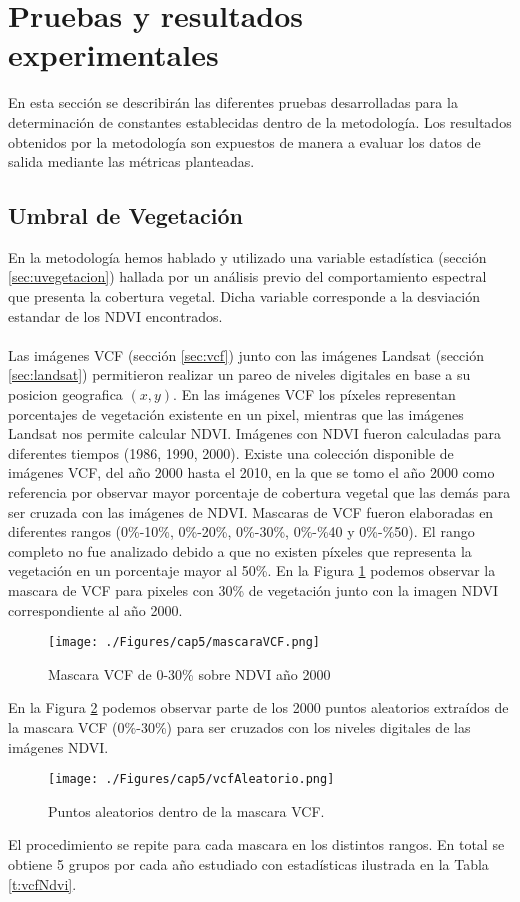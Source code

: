 \section{Pruebas y resultados experimentales}
En esta secci\'on se describir\'an las diferentes pruebas desarrolladas para la determinaci\'on de constantes establecidas dentro de la metodolog\'ia. Los resultados obtenidos por la metodolog\'ia son expuestos de manera a evaluar los datos de salida mediante las m\'etricas planteadas.
\subsection{Umbral de Vegetaci\'on}\label{subsec:umbralVegetacion}
En la metodolog\'ia hemos hablado y utilizado una variable estad\'istica (secci\'on \ref{sec:uvegetacion}) hallada por un an\'alisis previo del comportamiento espectral que presenta la cobertura vegetal. Dicha variable corresponde a la desviaci\'on estandar de los NDVI encontrados.\\~\\
Las im\'agenes VCF (secci\'on \ref{sec:vcf}) junto con las im\'agenes Landsat (secci\'on \ref{sec:landsat}) permitieron realizar un pareo de niveles digitales en base a su posicion geografica $ (x,y) $. En las im\'agenes VCF los p\'ixeles representan porcentajes de vegetaci\'on existente en un pixel, mientras que las im\'agenes Landsat nos permite calcular NDVI. Im\'agenes con NDVI fueron calculadas para diferentes tiempos (1986, 1990, 2000). Existe una colecci\'on disponible de im\'agenes VCF, del a\~{n}o 2000 hasta el 2010, en la que se tomo el a\~{n}o 2000 como referencia por observar mayor porcentaje de cobertura vegetal que las dem\'as para ser cruzada con las im\'agenes de NDVI. Mascaras de VCF fueron elaboradas en diferentes rangos (0\%-10\%, 0\%-20\%, 0\%-30\%, 0\%-\%40 y 0\%-\%50). El rango completo no fue analizado debido a que no existen p\'ixeles que representa la vegetaci\'on en un porcentaje mayor al 50\%. En la Figura \ref{fig:mascVCf} podemos observar la mascara de VCF para pixeles con 30\% de vegetaci\'on junto con la imagen NDVI correspondiente al a\~{n}o 2000.
\begin{figure}[H]
	\centering
	\texttt{[image: ./Figures/cap5/mascaraVCF.png]}
	\caption{Mascara VCF de 0-30\% sobre NDVI a\~{n}o 2000}
	\label{fig:mascVCf}
\end{figure}
En la Figura \ref{fig:aleatorioVCf} podemos observar parte de los 2000 puntos aleatorios extra\'idos de la mascara VCF (0\%-30\%) para ser cruzados con los niveles digitales de las im\'agenes NDVI.
\begin{figure}[H]
	\centering
	\texttt{[image: ./Figures/cap5/vcfAleatorio.png]}
	\caption{Puntos aleatorios dentro de la mascara VCF.}
	\label{fig:aleatorioVCf}
\end{figure}
El procedimiento se repite para cada mascara en los distintos rangos. En total se obtiene 5 grupos por cada a\~{n}o estudiado con estad\'isticas ilustrada en la Tabla \ref{t:vcfNdvi}.

